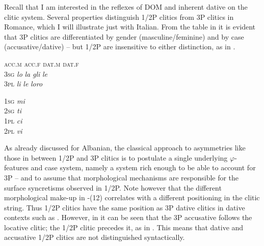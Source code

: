 \documentclass[output=paper]{langscibook}
\begin{document}
Recall that I am interested in the reflexes of DOM and inherent dative on the clitic system. {Several properties distinguish 1/2P clitics from 3P clitics in Romance, which I will illustrate just with Italian. From the table in  it is evident that 3P clitics are differentiated by gender (masculine/feminine) and by case (accusative/dative) – but 1/2P are insensitive to either distinction, as in .}

\ea\label{ex:manzini:}
\glll {} \textsc{acc.m}   \textsc{acc.f}     \textsc{dat.m}   \textsc{dat.f}\\
\textsc{3sg}    \textit{lo}     \textit{la}     \textit{gli}     \textit{le}\\
\textsc{3pl}    \textit{li}     \textit{le}     \textit{loro}\\
\z

\ea\label{ex:manzini:}
\gllll \textsc{1sg}    \textit{mi}\\
\textsc{2sg}    \textit{ti}\\
\textsc{1pl}    \textit{ci}\\
\textsc{2pl}    \textit{vi}\\
\z

As already discussed for Albanian, the classical approach to asymmetries like those in  between 1/2P and 3P clitics is to postulate a single underlying $\varphi ${}-features and case system, namely a system rich enough to be able to account for 3P – and to assume that morphological mechanisms are responsible for the surface syncretisms observed in 1/2P. Note however that the different morphological make-up in -(12) correlates with a different positioning in the clitic string. Thus 1/2P clitics have the same position as 3P dative clitics in dative contexts such as . However, in  it can be seen that the 3P accusative follows the locative clitic; the 1/2P clitic precedes it, as in . This means that dative and accusative 1/2P clitics are not distinguished syntactically.
\end{document}
